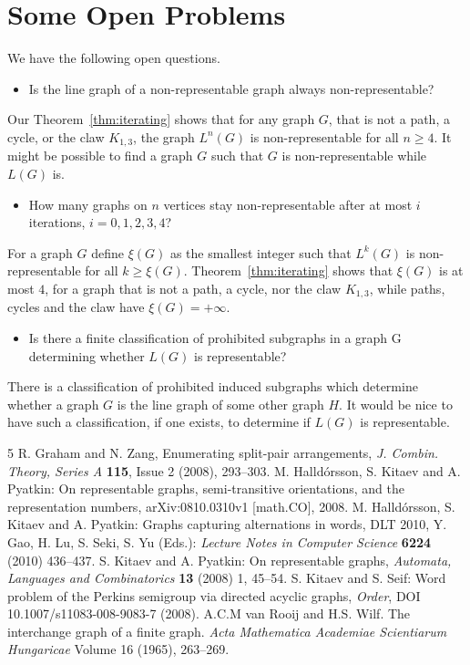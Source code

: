 \documentclass[12pt]{article}
\begin{document}
\section{Some Open Problems}\label{finalRemarks}


We have the following open questions.

\begin{itemize}
\item Is the line graph of a non-representable graph always non-representable?
\end{itemize}
Our Theorem~\ref{thm:iterating} shows that for any graph $G$, that is not a path, a cycle, or the claw $K_{1,3}$, the graph $L^{n}(G)$ is non-representable for all $n \geqslant 4$. It might be possible to find a graph $G$ such that $G$ is non-representable while $L(G)$ is.

\begin{itemize}
\item How many graphs on $n$ vertices stay non-representable after at most $i$ iterations, $i = 0,1,2,3,4$?
\end{itemize}
For a graph $G$ define $\xi(G)$ as the smallest integer such that $L^{k}(G)$ is non-representable for all
$k \geqslant \xi(G)$. Theorem~\ref{thm:iterating} shows that $\xi(G)$ is at most $4$, for a graph that
is not a path, a cycle, nor the claw $K_{1,3}$, while paths, cycles and the claw have $\xi(G) = + \infty$.


\begin{itemize}
\item Is there a finite classification of prohibited subgraphs in a graph G determining whether $L(G)$
is representable?
\end{itemize}
There is a classification of prohibited induced subgraphs which determine whether a graph $G$ is the line graph of some other graph $H$. It would be nice to have such a classification, if one exists, to determine if $L(G)$ is representable.

\begin{thebibliography}{5}
 R. Graham and N. Zang, Enumerating split-pair arrangements,
\emph{J. Combin. Theory, Series A} {\bf 115}, Issue 2 (2008), 293--303.
 M. Halld\'orsson, S. Kitaev and A. Pyatkin: On representable graphs, semi-transitive orientations, and the representation numbers, arXiv:0810.0310v1 [math.CO], 2008.
 M. Halld\'orsson, S. Kitaev and A. Pyatkin: Graphs capturing alternations in words, DLT 2010, Y. Gao, H. Lu, S. Seki, S. Yu (Eds.): {\em Lecture Notes in Computer Science} {\bf 6224} (2010) 436--437.
 S. Kitaev and A. Pyatkin: On representable graphs, {\em Automata, Languages and Combinatorics} {\bf 13} (2008) 1, 45--54.
 S. Kitaev and S. Seif: Word problem of the Perkins semigroup via directed acyclic graphs, {\em Order}, DOI 10.1007/s11083-008-9083-7 (2008).
 A.C.M van Rooij and H.S. Wilf. The interchange graph of a finite graph. \emph{Acta Mathematica Academiae Scientiarum Hungaricae} Volume 16 (1965), 263--269.
\end{thebibliography}
\end{document}
